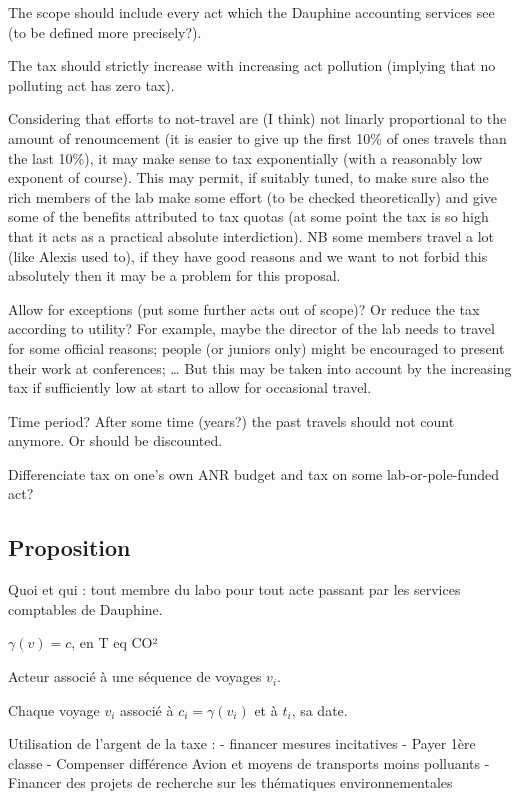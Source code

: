\documentclass[version=3.21, pagesize, twoside=off, bibliography=totoc, DIV=calc, fontsize=12pt, a4paper, french, english]{scrartcl}
\begin{document}
The scope should include every act which the Dauphine accounting services see (to be defined more precisely?).

The tax should strictly increase with increasing act pollution (implying that no polluting act has zero tax).

Considering that efforts to not-travel are (I think) not linarly proportional to the amount of renouncement (it is easier to give up the first 10\% of ones travels than the last 10\%), it may make sense to tax exponentially (with a reasonably low exponent of course). This may permit, if suitably tuned, to make sure also the rich members of the lab make some effort (to be checked theoretically) and give some of the benefits attributed to tax quotas (at some point the tax is so high that it acts as a practical absolute interdiction). NB some members travel a lot (like Alexis used to), if they have good reasons and we want to not forbid this absolutely then it may be a problem for this proposal.

Allow for exceptions (put some further acts out of scope)? Or reduce the tax according to utility? For example, maybe the director of the lab needs to travel for some official reasons; people (or juniors only) might be encouraged to present their work at conferences; … But this may be taken into account by the increasing tax if sufficiently low at start to allow for occasional travel.

Time period? After some time (years?) the past travels should not count anymore. Or should be discounted.

Differenciate tax on one’s own ANR budget and tax on some lab-or-pole-funded act?

\subsection{Proposition}
Quoi et qui : tout membre du labo pour tout acte passant par les services comptables de Dauphine.

$\gamma(v) = c$, en T eq CO²

Acteur associé à une séquence de voyages $v_i$.

Chaque voyage $v_i$ associé à $c_i = \gamma(v_i)$ et à $t_i$, sa date.

Utilisation de l’argent de la taxe :
- financer mesures incitatives
- Payer 1ère classe
- Compenser différence Avion et moyens de transports moins polluants
- Financer des projets de recherche sur les thématiques environnementales
\end{document}
